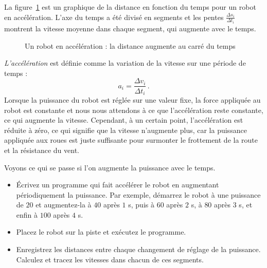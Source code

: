La figure~\ref{fig.instant-v} est un graphique de la distance en fonction du temps pour un robot en accélération. L'axe du temps a été divisé en segments et les pentes $\displaystyle\frac{\Delta s_i}{\Delta t_i}$ montrent la vitesse moyenne dans chaque segment, qui augmente avec le temps.

\begin{figure}
\begin{center}
\caption{Un robot en accélération : la distance augmente au carré du temps}\label{fig.instant-v}
\end{center}
\end{figure}

\emph{L'accélération} est définie comme la variation de la vitesse sur une période de temps :
\[a_i = \frac{\Delta v_i}{\Delta t_i}\,.\]
Lorsque la puissance du robot est réglée sur une valeur fixe, la force appliquée au robot est constante et nous nous attendons à ce que l'accélération reste constante, ce qui augmente la vitesse. Cependant, à un certain point, l'accélération est réduite à zéro, ce qui signifie que la vitesse n'augmente plus, car la puissance appliquée aux roues est juste suffisante pour surmonter le frottement de la route et la résistance du vent.

Voyons ce qui se passe si l'on augmente la puissance avec le temps.

\begin{framed}
\begin{itemize}
\item Écrivez un programme qui fait accélérer le robot en augmentant périodiquement la puissance. Par exemple, démarrez le robot à une puissance de $20$ et augmentez-la à $40$ après $1$ s, puis à $60$ après $2$ s, à $80$ après $3$ s, et enfin à $100$ après $4$ s.
\item Placez le robot sur la piste et exécutez le programme.
\item Enregistrez les distances entre chaque changement de réglage de la puissance. Calculez et tracez les vitesses dans chacun de ces segments.
\end{itemize}
\end{framed}


